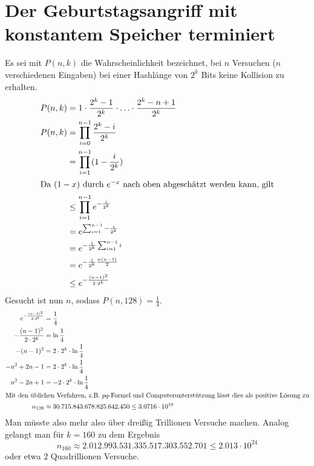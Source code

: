 \documentclass{../crypto}
\date{4. Dezember 2015}
\begin{document}
\maketitle

\section{Der Geburtstagsangriff mit konstantem Speicher terminiert}
Es sei mit $P(n,k)$ die Wahrscheinlichkeit bezeichnet, bei $n$ Versuchen ($n$ verschiedenen Eingaben) bei einer Hashlänge von $2^k$ Bits keine Kollision zu erhalten.
\begin{align*}
   P(n,k)  & = 1 \cdot \frac{2^k - 1}{2^k} \cdot \ldots \cdot \frac{2^k - n + 1}{2^k} \\
   P(n,k)  & =   \prod_{i=0}^{n-1} \frac{2^k - i}{2^k}                                \\
           & =   \prod_{i=1}^{n-1} (1 -  \frac{i}{2^k})                               \\
\intertext{Da $(1-x)$ durch $e^{-x}$ nach oben abgeschätzt werden kann, gilt}
           & \le \prod_{i=1}^{n-1} e^{-\frac{i}{2^k}} \\
           & =   e^{\sum_{i=1}^{n-1}-\frac{i}{2^k}}   \\
           & =   e^{-\frac{1}{2^k}\sum_{i=1}^{n-1}i}  \\
           & =   e^{-\frac{1}{2^k} \frac{n(n-1)}{2}}  \\
           & \le   e^{-\frac{(n-1)^2}{2\cdot 2^k}}    \\
\end{align*}
Gesucht ist nun $n$, sodass $P(n,128) = \frac{1}{4}$.
\begin{align*}
   e^{-\frac{(n-1)^2}{2\cdot 2^k}} & = \frac{1}{4}                        \\
   -\frac{(n-1)^2}{2\cdot 2^k}     & = \ln{\frac{1}{4}}                   \\
   -(n-1)^2                        & = 2\cdot 2^k \cdot \ln{\frac{1}{4}}  \\
   -n^2 + 2n - 1                   & = 2\cdot 2^k \cdot \ln{\frac{1}{4}}  \\
   n^2 - 2n + 1                    & = -2\cdot 2^k \cdot \ln{\frac{1}{4}} \\
   \intertext{Mit den üblichen Verfahren, z.B. $pq$-Formel und
   Computerunterstützung lässt dies als positive Lösung zu}
   n_{128}                         & \approx 30.715.843.678.825.642.450 \le 3.0716 \cdot 10^{19}
\end{align*}
Man müsste also mehr also über dreißig Trillionen Versuche machen. Analog gelangt man für $k=160$ zu dem Ergebnis 
\begin{equation*}
   n_{160} \approx 2.012.993.531.335.517.303.552.701 \le 2.013 \cdot 10^{24}
\end{equation*}
oder etwa $2$ Quadrillionen Versuche.
\end{document}
